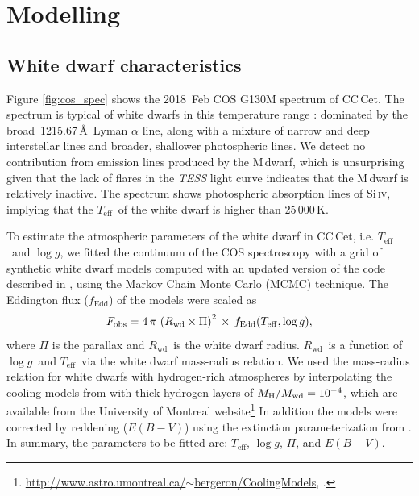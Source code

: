\documentclass[fleqn,usenatbib]{mnras}
\newcommand{\Rwd}{\mbox{$R_{\mathrm{wd}}$}}
\newcommand{\Mwd}{\mbox{$M_{\mathrm{wd}}$}}
\newcommand{\Ion}[2]{#1{\,\textsc{#2}}}
\newcommand{\Teff}{\mbox{$T_{\mathrm{eff}}$}}
\newcommand{\logg}{\mbox{$\log g$}}
\begin{document}
\section{Modelling}
\label{sec:models}
\subsection{White dwarf characteristics}
\label{sec:wdparams}
Figure \ref{fig:cos_spec} shows the 2018~Feb COS G130M spectrum of CC\,Cet. The spectrum is typical of white dwarfs in this temperature range \citep{koesteretal14-1}: dominated by the broad \,1215.67\,\AA\ Lyman $\alpha$ line, along with a mixture of narrow and deep interstellar lines and broader, shallower photospheric lines. We detect no contribution from emission lines produced by the M\,dwarf, which is unsurprising given that the lack of flares in the \textit{TESS} light curve indicates that the M\,dwarf is relatively inactive. The spectrum shows photospheric absorption lines of \Ion{Si}{iv}, implying that the \Teff\ of the white dwarf is higher than 25\,000\,K.

To estimate the atmospheric parameters of the white dwarf in CC\,Cet, i.e. \Teff\ and \logg, we fitted the continuum of the COS spectroscopy with a grid of synthetic white dwarf models computed with an updated version of the code described in \citet{koester10-1}, using the Markov Chain Monte Carlo (MCMC) technique. The Eddington flux ($f_\text{Edd}$) of the models were scaled as
\begin{equation}
    F_{\rm obs} = 4\,\pi\,\left(\Rwd \times \Pi\right)^{2}\,\times\,f_{\rm Edd}(\Teff, \logg),
    \label{eq:model}
\end{equation}
where $\Pi$ is the parallax and \Rwd\ is the white dwarf radius. \Rwd\ is a function of \logg\ and \Teff\ via the white dwarf mass-radius relation. We used the mass-radius relation for white dwarfs with hydrogen-rich atmospheres by interpolating the cooling models from \citet{fontaineetal01-1} with thick hydrogen layers of $M_{\rm H}/\Mwd=10^{-4}$, which are available from the University of Montreal website\footnote{\href{http://www.astro.umontreal.ca/~bergeron/CoolingModels}{http://www.astro.umontreal.ca/$\sim$bergeron/CoolingModels}, \citet{bergeronetal95-2, holberg+bergeron06-1, tremblayetal11-2,kowalski+saumon06-1}.} 
In addition the models were corrected by reddening ($E(B-V)$) using the extinction parameterization from  \citet{fitzpatrick99-1}. In summary, the parameters to be fitted are: \Teff, \logg, $\Pi$, and $E(B-V)$.
\end{document}
